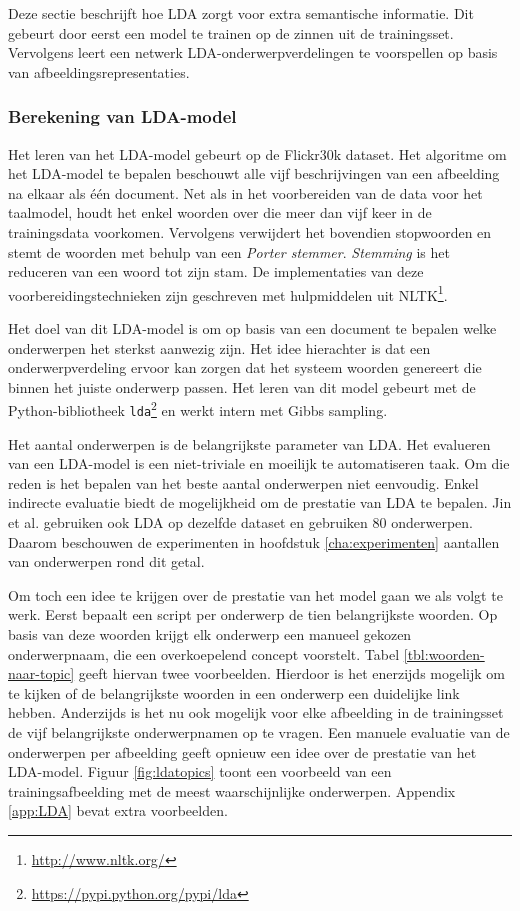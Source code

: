 Deze sectie beschrijft hoe LDA zorgt voor extra semantische informatie. Dit gebeurt door eerst een model te trainen op de zinnen uit de trainingsset. Vervolgens leert een netwerk LDA-onderwerpverdelingen te voorspellen op basis van afbeeldingsrepresentaties.

\subsubsection{Berekening van LDA-model}
\label{subs:Berekening van onderwerpverdeling}
Het leren van het LDA-model gebeurt op de Flickr30k dataset. Het algoritme om het LDA-model te bepalen beschouwt alle vijf beschrijvingen van een afbeelding na elkaar als \'e\'en document. Net als in het voorbereiden van de data voor het taalmodel, houdt het enkel woorden over die meer dan vijf keer in de trainingsdata voorkomen. Vervolgens verwijdert het bovendien stopwoorden en stemt de woorden met behulp van een \emph{Porter stemmer}. \emph{Stemming} is het reduceren van een woord tot zijn stam. De implementaties van deze voorbereidingstechnieken zijn geschreven met hulpmiddelen uit NLTK\footnote{\url{http://www.nltk.org/}}.

Het doel van dit LDA-model is om op basis van een document te bepalen welke onderwerpen het sterkst aanwezig zijn. Het idee hierachter is dat een onderwerpverdeling ervoor kan zorgen dat het systeem woorden genereert die binnen het juiste onderwerp passen. Het leren van dit model gebeurt met de Python-bibliotheek \texttt{lda}\footnote{\url{https://pypi.python.org/pypi/lda}} en werkt intern met Gibbs sampling.

Het aantal onderwerpen is de belangrijkste parameter van LDA. Het evalueren van een LDA-model is een niet-triviale en moeilijk te automatiseren taak. Om die reden is het bepalen van het beste aantal onderwerpen niet eenvoudig. Enkel indirecte evaluatie biedt de mogelijkheid om de prestatie van LDA te bepalen. Jin et al.\cite{Jin2015} gebruiken ook LDA op dezelfde dataset en gebruiken 80 onderwerpen. Daarom beschouwen de experimenten in hoofdstuk \ref{cha:experimenten} aantallen van onderwerpen rond dit getal. 

Om toch een idee te krijgen over de prestatie van het model gaan we als volgt te werk. Eerst bepaalt een script per onderwerp de tien belangrijkste woorden. Op basis van deze woorden krijgt elk onderwerp een manueel gekozen onderwerpnaam, die een overkoepelend concept voorstelt. Tabel \ref{tbl:woorden-naar-topic} geeft hiervan twee voorbeelden. 
Hierdoor is het enerzijds mogelijk om te kijken of de belangrijkste woorden in een onderwerp een duidelijke link hebben. Anderzijds is het nu ook mogelijk voor elke afbeelding in de trainingsset de vijf belangrijkste onderwerpnamen op te vragen. Een manuele evaluatie van de onderwerpen per afbeelding geeft opnieuw een idee over de prestatie van het LDA-model. Figuur \ref{fig:ldatopics} toont een voorbeeld van een trainingsafbeelding met de meest waarschijnlijke onderwerpen. Appendix \ref{app:LDA} bevat extra voorbeelden.

